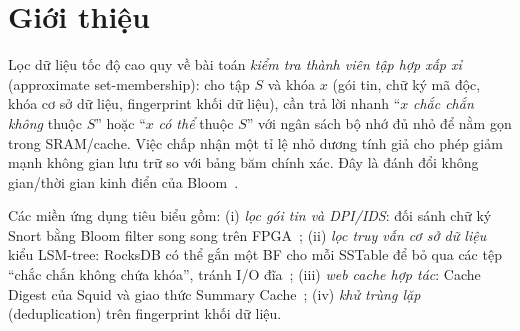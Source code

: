 \documentclass[11pt,a4paper]{article}
\begin{document}
\begin{abstract}
Báo cáo so sánh Bloom Filter (BF, Bloom 1970) và Counting Bloom Filter (CBF,
Fan \emph{et al.} 2000) cho bài toán lọc dữ liệu tốc độ cao (lọc gói tin,
deep packet inspection, lọc truy vấn cơ sở dữ liệu, lọc cache, khử trùng lặp).
Chúng tôi trình bày cơ sở lý thuyết, công thức xác suất dương tính giả (false
positive), phân tích tràn counter, mã giả cho các thao tác insert/query/delete,
và một bộ thực nghiệm Python tự cài đặt cả hai cấu trúc. Kết quả trên
$n=\NKeys{}$ khóa xác nhận: (i) tỉ lệ dương tính giả (FPR) thực nghiệm bám sát
công thức $p=(1-e^{-kn/m})^k$ và khi dùng cùng bộ hàm băm, cùng $m$, $k$ thì BF
và CBF cho kết quả truy vấn \emph{trùng nhau từng khóa}; (ii) phần dữ liệu
chính (payload) của CBF 4-bit tốn đúng $4\times$ BF, do đó với cùng ngân
sách byte, FPR của CBF (\EqFprCBFFour{}) cao hơn BF (\EqFprBF{}) khoảng
\EqRatioFour{} lần, tức hơn một bậc độ lớn; (iii) CBF hỗ trợ
xóa an toàn khi bên gọi (caller) chỉ xóa khóa chắc chắn đã chèn: xóa đúng
\FnValidDeleted{} khóa không làm mất khóa thật nào còn lại, trong khi stress
test trên một bộ lọc riêng chứa đủ $n$ khóa, cố ý xóa các false positive,
tạo ra \FnCount{} false negative (\FnRate{} của $n$); (iv)~ở cùng mức
${\approx}10$ bit/khóa, trong các cấu trúc hỗ trợ xóa, Cuckoo Filter đạt
FPR \CkFpr{}, thấp hơn CBF 4-bit hơn một bậc độ lớn. Kết luận: dùng BF
cho tập gần như tĩnh; dùng CBF khi cần xóa động
và hệ thống bảo đảm được contract của delete; khi cần xóa với FPR mục tiêu
$<3\%$, Cuckoo Filter là lựa chọn đáng cân nhắc hơn.
\end{abstract}

\section{Giới thiệu}
Lọc dữ liệu tốc độ cao quy về bài toán \emph{kiểm tra thành viên tập hợp xấp
xỉ} (approximate set-membership): cho tập $S$ và khóa $x$ (gói tin, chữ ký mã
độc, khóa cơ sở dữ liệu, fingerprint khối dữ liệu), cần trả lời nhanh ``$x$
\emph{chắc chắn không} thuộc $S$'' hoặc ``$x$ \emph{có thể} thuộc $S$'' với
ngân sách bộ nhớ đủ nhỏ để nằm gọn trong SRAM/cache. Việc chấp nhận một tỉ lệ
nhỏ dương tính giả cho phép giảm mạnh không gian lưu trữ so với bảng băm chính
xác. Đây là đánh đổi không gian/thời gian kinh điển của
Bloom~\cite{bloom1970}.

Các miền ứng dụng tiêu biểu gồm: (i) \emph{lọc gói tin và DPI/IDS}: đối sánh
chữ ký Snort bằng Bloom filter song song trên FPGA~\cite{dpi2003}; (ii)
\emph{lọc truy vấn cơ sở dữ liệu} kiểu LSM-tree: RocksDB có thể gắn một BF cho
mỗi SSTable để bỏ qua các tệp ``chắc chắn không chứa khóa'', tránh I/O
đĩa~\cite{rocksdbBloom}; (iii) \emph{web cache hợp tác}: Cache Digest của Squid và giao thức
Summary Cache~\cite{fan2000}; (iv) \emph{khử trùng lặp} (deduplication) trên
fingerprint khối dữ liệu.
\end{document}

